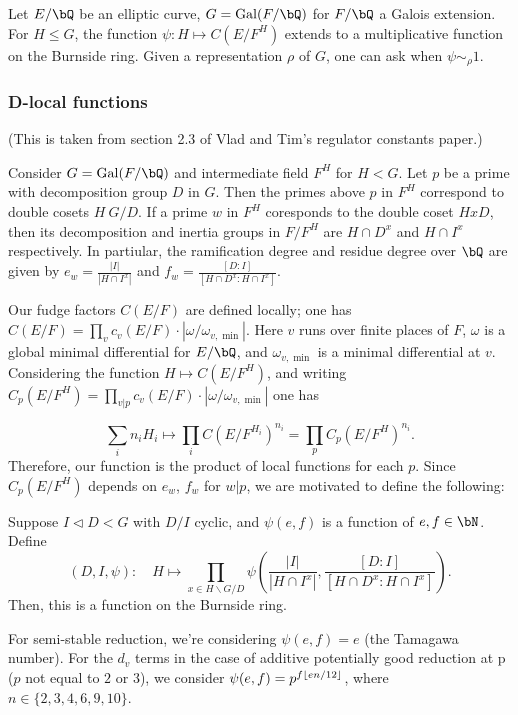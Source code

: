 \begin{example}
Let $E / \bQ$ be an elliptic curve, $G = \Gal(F / \bQ)$ for $F / \bQ$ a Galois extension. For $H \leq G$, the function $\psi \colon H \mapsto C(E / F^H)$ extends to a multiplicative function on the Burnside ring. Given a representation $\rho$ of $G$, one can ask when $\psi \sim_{\rho} 1$.
\end{example}

\subsubsection{D-local functions}\label{D-loc}

(This is taken from section 2.3 of Vlad and Tim's regulator constants paper.)

Consider $G = \Gal(F / \bQ)$ and intermediate field $F^H$ for $H < G$. Let $p$ be a prime with decomposition group $D$ in $G$. 
Then the primes above $p$ in $F^H$ correspond to double cosets $H\ G/ D$. If a prime $w$ in $F^H$ coresponds to the double coset $HxD$, then its decomposition and inertia groups in $F / F^H$ are $H \cap D^x$ and $H \cap I^x$ respectively. In partiular, the ramification degree and residue degree over $\bQ$ are given by $e_w = \frac{|I|}{|H \cap I^x|}$ and $f_w = \frac{[D \colon I]}{[H \cap D^x \colon H \cap I^x]}$. 

Our fudge factors $C(E / F)$ are defined locally; one has $C(E / F) = \prod_v c_v(E / F) \cdot |\omega / \omega_{v, \min}|$. Here $v$ runs over finite places of $F$, $\omega$ is a global minimal differential for $E / \bQ$, and $\omega_{v, \min}$ is a minimal differential at $v$.
Considering the function $H \mapsto C(E / F^H)$, and writing $C_p(E / F^H) =\prod_{v | p} c_v(E / F)\cdot |\omega / \omega_{v, \min}|$ one has

\[ \sum_{i} n_i H_i \mapsto \prod_i C(E / F^{H_i})^{n_i} = \prod_{p} C_p(E / F^H)^{n_i}. \]
Therefore, our function is the product of local functions for each $p$. Since $C_p(E / F^H)$ depends on $e_w$, $f_w$ for $w | p$, we are motivated to define the following:

\begin{defn}
    Suppose $I \triangleleft D < G$ with $D / I$ cyclic, and $\psi(e,f)$ is a function of $e, f \in \bN$. Define
    \[ \left(D, I, \psi\right) \colon \quad H \mapsto \prod_{x \in H\backslash G / D} \psi\left(\frac{|I|}{|H \cap I^x|}, \frac{[D \colon I]}{[H \cap D^x \colon H \cap I^x]}\right). \]
    Then, this is a function on the Burnside ring.
\end{defn}

\begin{example}
For semi-stable reduction, we're considering $\psi(e, f) = e$ (the Tamagawa number). For the $d_v$ terms in the case of additive potentially good reduction at p ($p$ not equal to $2$ or $3$), we consider $\psi(e, f) = p^{f \lfloor e n /12\rfloor}$, where $n \in \{2,3,4,6,9,10\}$.
\end{example}



